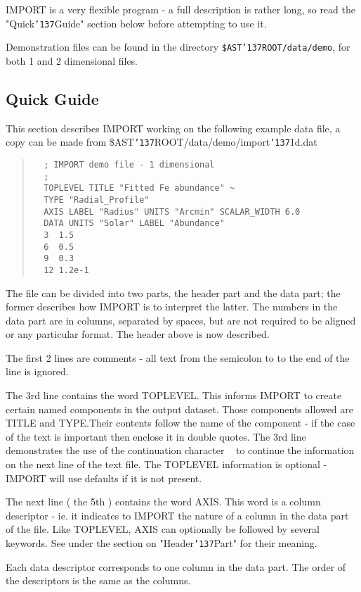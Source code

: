 \documentclass{book}
\renewcommand{\_}{{\tt\char'137}}     %
\begin{document}
IMPORT is a very flexible program - a full description is rather
long, so read the "Quick\_Guide" section below before attempting
to use it.

Demonstration files can be found in the directory {\tt \$AST\_ROOT/data/demo}, for
both 1 and 2 dimensional files.

\subsection{Quick Guide}
This section describes IMPORT working on the following example data file, a
copy can be made from \$AST\_ROOT/data/demo/import\_1d.dat

\begin{quote}\begin{verbatim}
  ; IMPORT demo file - 1 dimensional
  ;
  TOPLEVEL TITLE "Fitted Fe abundance" ~
  TYPE "Radial_Profile"
  AXIS LABEL "Radius" UNITS "Arcmin" SCALAR_WIDTH 6.0
  DATA UNITS "Solar" LABEL "Abundance"
  3  1.5
  6  0.5
  9  0.3
  12 1.2e-1
\end{verbatim}\end{quote}
The file can be divided into two parts, the header part and the
data part; the former describes how IMPORT is to interpret the
latter. The numbers in the data part are in columns, separated
by spaces, but are not required to be aligned or any particular
format. The header above is now described.

The first 2 lines are comments - all text from the semicolon to
to the end of the line is ignored.

The 3rd line contains the word TOPLEVEL. This informs IMPORT to
create certain named components in the output dataset. Those
components allowed are TITLE and TYPE.Their contents follow the
name of the component - if the case of the text is important
then enclose it in double quotes. The 3rd line demonstrates the
use of the continuation character {\tt ~} to continue the information
on the next line of the text file. The TOPLEVEL information is
optional - IMPORT will use defaults if it is not present.

The next line ( the 5th ) contains the word AXIS. This word is
a column descriptor - ie. it indicates to IMPORT the nature of
a column in the data part of the file. Like TOPLEVEL, AXIS can
optionally be followed by several keywords. See under the
section on "Header\_Part" for their meaning.

Each data descriptor corresponds to one column in the data part.
The order of the descriptors is the same as the columns.
\end{document}

